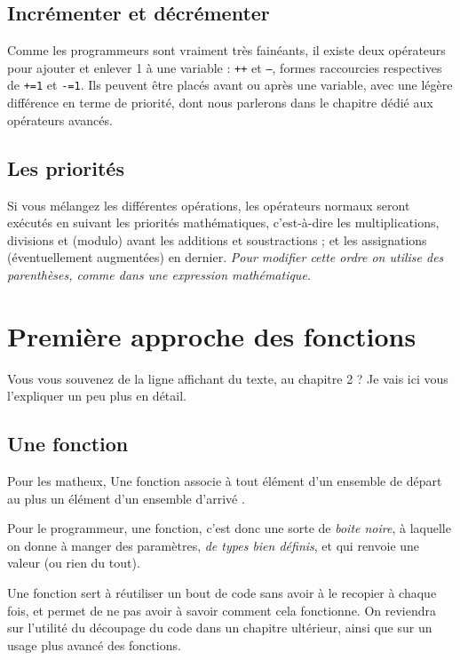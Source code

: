 \subsection{Incrémenter et décrémenter}
Comme les programmeurs sont vraiment très fainéants, il existe deux opérateurs pour ajouter et enlever 1 à une variable : \texttt{++} et \texttt{--}, formes raccourcies respectives de \texttt{+=1} et \texttt{-=1}. Ils peuvent être placés avant ou après une variable, avec une légère différence en terme de priorité, dont nous parlerons dans le chapitre dédié aux opérateurs avancés.

\subsection{Les priorités}
Si vous mélangez les différentes opérations, les opérateurs normaux seront exécutés en suivant les priorités mathématiques, c'est-à-dire les multiplications, divisions et (modulo) avant les additions et soustractions ; et les assignations (éventuellement augmentées) en dernier.
\emph{Pour modifier cette ordre on utilise des parenthèses, comme dans une expression mathématique.}

\pagebreak

\section{Première approche des fonctions}
Vous vous souvenez de la ligne affichant du texte, au chapitre 2 ? Je vais ici vous l'expliquer un peu plus en détail.

\subsection{Une fonction}
Pour les matheux, \og Une fonction associe à tout élément d'un ensemble de départ au plus un élément d'un ensemble d'arrivé \fg{}.

Pour le programmeur, une fonction, c'est donc une sorte de \emph{boite noire}, à laquelle on donne à manger des paramètres, \emph{de types bien définis}, et qui renvoie une valeur (ou rien du tout).

Une fonction sert à réutiliser un bout de code sans avoir à le recopier à chaque fois, et permet de ne pas avoir à savoir comment cela fonctionne.
On reviendra sur l'utilité du découpage du code dans un chapitre ultérieur,
ainsi que sur un usage plus avancé des fonctions.

